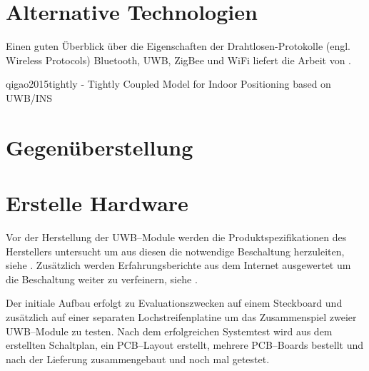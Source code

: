 	
\begin{comment}
------------------------------------------------------------------------------------------
\end{comment}
\section{Alternative Technologien}

\begin{comment}
Welche alternativen Technologien gibt es zu UWB?
\end{comment}

Einen guten Überblick über die Eigenschaften der Drahtlosen-Protokolle (engl. Wireless Protocols) Bluetooth, UWB, ZigBee und WiFi liefert die Arbeit \cite{lee2007comparative} von \citeauthor{lee2007comparative}.

qigao2015tightly - Tightly Coupled Model for Indoor Positioning based on UWB/INS


\begin{comment}
------------------------------------------------------------------------------------------
\end{comment}
\section{Gegenüberstellung}

\begin{comment}
Welche Eigenschaften haben die alternativen Technologien?
Warum hab ich mich für UWB entschieden?
\end{comment}


\begin{comment}
------------------------------------------------------------------------------------------
\end{comment}
\section{Erstelle Hardware}

Vor der Herstellung der UWB--Module werden die Produktspezifikationen des Herstellers untersucht um aus diesen die notwendige Beschaltung herzuleiten, siehe \cite{decawave2016dwm1kdatasheet, decawave2013power}. Zusätzlich werden Erfahrungsberichte aus dem Internet ausgewertet um die Beschaltung weiter zu verfeinern, siehe \cite{Trojer2015, Holder2016, Holder2016a}.

Der initiale Aufbau erfolgt zu Evaluationszwecken auf einem Steckboard und zusätzlich auf einer separaten Lochstreifenplatine um das Zusammenspiel zweier UWB--Module zu testen. Nach dem erfolgreichen Systemtest wird aus dem erstellten Schaltplan, ein PCB--Layout erstellt, mehrere PCB--Boards bestellt und nach der Lieferung zusammengebaut und noch mal getestet.



